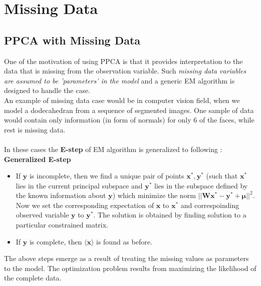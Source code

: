 \chapter{Missing Data}
\section{PPCA with Missing Data}
One of the motivation of using PPCA is that it provides interpretation to the data that is missing from the observation variable. Such \emph{missing data variables are assumed to be 'parameters' in the model} and a generic EM algorithm is designed to handle the case.\\
An example of missing data case would be in computer vision field, when we model a dodecahedran from a sequence of segmented images. One sample of data would contain only information (in form of normals) for only 6 of the faces, while rest is missing data.\\\\
In these cases the \textbf{E-step} of EM algorithm is generalized to following :\\
\textbf{Generalized E-step} \citep{SPCA} 
\begin{itemize}
\item If $\mathbf{y}$ is incomplete, then we find a unique pair of points $\mathbf{x^*, y^*}$ (such that $\mathbf{x^*}$ lies in the current principal subspace and $\mathbf{y^*}$ lies in the subspace defined by the known information about $\mathbf{y}$) which minimize the norm $||\mathbf{Wx^*-y^*+\mu}||^2$. Now we set the corresponding expectation of $\mathbf{x}$ to $\mathbf{x^*}$ and correspoinding observed variable $\mathbf{y}$ to $\mathbf{y^*}$. The solution is obtained by finding solution to a particular constrained matrix.
\item If $\mathbf{y}$ is complete, then $\langle \mathbf{x} \rangle$ is found as before.
\end{itemize}
The above steps emerge as a result of treating the missing values as parameters to the model. The optimization problem results from maximizing the likelihood of the complete data. 
\pagebreak
